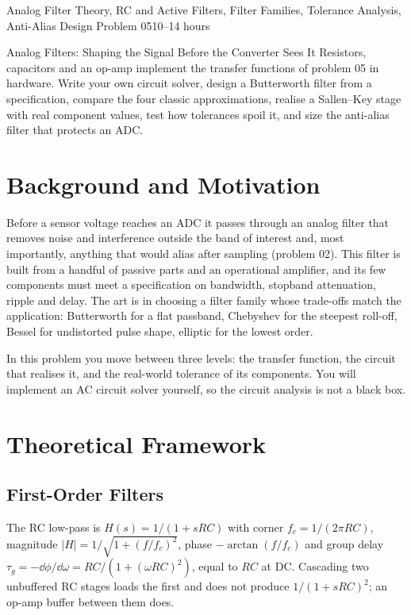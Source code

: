 \documentclass[11pt,a4paper]{article}
\begin{document}
%
{Analog Filter Theory, RC and Active Filters, Filter Families, Tolerance Analysis, Anti-Alias Design}%
{Problem 05}{10--14 hours}

\begin{summarybox}{Analog Filters: Shaping the Signal Before the Converter Sees It}
Resistors, capacitors and an op-amp implement the transfer functions of problem 05 in hardware. Write your own circuit solver, design a Butterworth filter from a specification, compare the four classic approximations, realise a Sallen--Key stage with real component values, test how tolerances spoil it, and size the anti-alias filter that protects an ADC.
\end{summarybox}


\section*{Background and Motivation}
Before a sensor voltage reaches an ADC it passes through an analog filter that removes noise and interference outside the band of interest and, most importantly, anything that would alias after sampling (problem 02). This filter is built from a handful of passive parts and an operational amplifier, and its few components must meet a specification on bandwidth, stopband attenuation, ripple and delay. The art is in choosing a filter family whose trade-offs match the application: Butterworth for a flat passband, Chebyshev for the steepest roll-off, Bessel for undistorted pulse shape, elliptic for the lowest order.

In this problem you move between three levels: the transfer function, the circuit that realises it, and the real-world tolerance of its components. You will implement an AC circuit solver yourself, so the circuit analysis is not a black box.

\section*{Theoretical Framework}
\subsection{First-Order Filters}
The RC low-pass is $H(s)=1/(1+sRC)$ with corner $f_c=1/(2\pi RC)$, magnitude $|H|=1/\sqrt{1+(f/f_c)^2}$, phase $-\arctan(f/f_c)$ and group delay $\tau_g=-\dd\phi/\dd\omega=RC/(1+(\omega RC)^2)$, equal to $RC$ at DC. Cascading two unbuffered RC stages loads the first and does not produce $1/(1+sRC)^2$; an op-amp buffer between them does.
\end{document}
